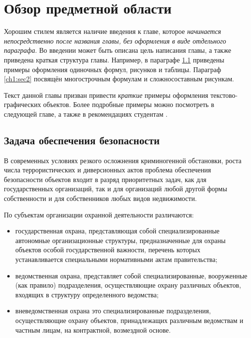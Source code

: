 \chapter{Обзор предметной области} \label{ch1}


Хорошим стилем является наличие введения к главе, которое \textit{начинается непосредственно после названия главы, без оформления в виде отдельного параграфа}. Во введении может быть описана цель написания главы, а также приведена краткая структура главы. Например, в параграфе \ref{ch1:sec1} приведены примеры оформления одиночных формул, рисунков и таблицы. Параграф \ref{ch1:sec2} посвящён многострочным формулам и сложносоставным рисункам.

Текст данной главы призван привести \textit{краткие} примеры оформления текстово-графических объектов. Более подробные примеры можно посмотреть в следующей главе, а также в рекомендациях студентам \cite{spbpu-student-thesis-template-author-guide}. 


\section{Задача обеспечения безопасности} \label{ch1:sec1}

В современных условиях резкого осложнения криминогенной обстановки, роста числа террористических и диверсионных актов проблема обеспечения безопасности объектов входит в разряд приоритетных задач, как для государственных организаций, так и для организаций любой другой формы собственности и для собственников любых видов недвижимости.

По субъектам организации охранной деятельности различаются:
\begin{itemize}
    \item государственная охрана, представляющая собой специализированные автономные организационные структуры, предназначенные для охраны объектов особой государственной важности, перечень которых устанавливается специальными нормативными актам правительства;
    \item ведомственная охрана, представляет собой специализированные, вооруженные (как правило) подразделения, осуществляющие охрану различных объектов, входящих в структуру определенного ведомства;
    \item вневедомственная охрана это специализированные подразделения, осуществляющие охрану объектов, принадлежащих различным ведомствам и частным лицам, на контрактной, возмездной основе.
\end{itemize}

